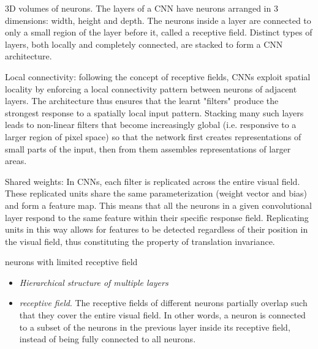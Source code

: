 \documentclass{article}
\begin{document}
3D volumes of neurons. The layers of a CNN have neurons arranged in 3 dimensions: width, height and depth. The neurons inside a layer are connected to only a small region of the layer before it, called a receptive field. Distinct types of layers, both locally and completely connected, are stacked to form a CNN architecture.

Local connectivity: following the concept of receptive fields, CNNs exploit spatial locality by enforcing a local connectivity pattern between neurons of adjacent layers. The architecture thus ensures that the learnt "filters" produce the strongest response to a spatially local input pattern. Stacking many such layers leads to non-linear filters that become increasingly global (i.e. responsive to a larger region of pixel space) so that the network first creates representations of small parts of the input, then from them assembles representations of larger areas.

Shared weights: In CNNs, each filter is replicated across the entire visual field. These replicated units share the same parameterization (weight vector and bias) and form a feature map. This means that all the neurons in a given convolutional layer respond to the same feature within their specific response field. Replicating units in this way allows for features to be detected regardless of their position in the visual field, thus constituting the property of translation invariance.



neurons with limited receptive field
\begin{itemize}
\item {\em Hierarchical structure of multiple layers}


\item {\em receptive field}.
  The receptive fields of different neurons partially overlap such that they
  cover the entire visual field. In other words, a neuron is connected to a
  subset of the neurons in the previous layer inside its receptive field, 
  instead of being fully connected to all neurons.
  
\end{itemize}
\end{document}
